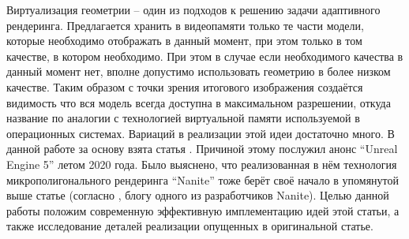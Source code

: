 Виртуализация геометрии -- один из подходов к решению задачи адаптивного рендеринга. Предлагается хранить в видеопамяти только те части модели, которые необходимо отображать в данный момент, при этом только в том качестве, в котором необходимо. При этом в случае если необходимого качества в данный момент нет, вполне допустимо использовать геометрию в более низком качестве. Таким образом с точки зрения итогового изображения создаётся видимость что вся модель всегда доступна в максимальном разрешении, откуда название по аналогии с технологией виртуальной памяти используемой в операционных системах. Вариаций в реализации этой идеи достаточно много. В данной работе за основу взята статья \cite{niski2007multi}. Причиной этому послужил анонс ``Unreal Engine 5'' \cite{ue5} летом 2020 года. Было выяснено, что реализованная в нём технология микрополигонального рендеринга ``Nanite'' тоже берёт своё начало в упомянутой выше статье (согласно \cite{graphicrants_vgi}, блогу одного из разработчиков Nanite). Целью данной работы положим современную эффективную имплементацию идей этой статьи, а также исследование деталей реализации опущенных в оригинальной статье.


